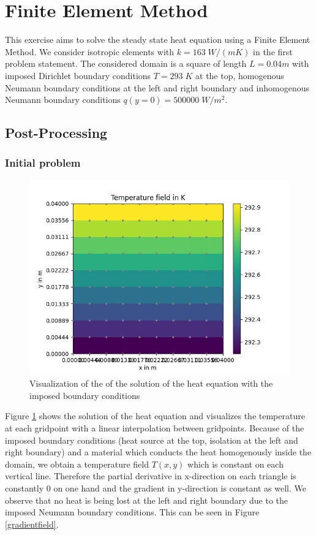 \documentclass[a4paper,pt]{report}
\begin{document}
\section*{Finite Element Method}
This exercise aims to solve the steady state heat equation using a Finite Element Method.
We consider isotropic elements with $k = 163 \;W/(mK)$ in the first problem statement.
The considered domain is a square of length $L=0.04 m$ with imposed Dirichlet boundary conditions $T=293 \; K$ at the top, homogenous Neumann boundary conditions at the left and right boundary and inhomogenous Neumann boundary conditions $q(y=0)=500000 \; W/m^2$.

\subsection*{Post-Processing}
\subsubsection*{Initial problem}

\begin{figure}
	\centering
	\includegraphics[scale=0.6]{temperaturefield.png}
	\caption{Visualization of the of the solution of the heat equation with the imposed boundary conditions}
	\label{temperaturefield}
\end{figure} 

Figure \ref{temperaturefield} shows the solution of the heat equation and visualizes the temperature at each gridpoint with a linear interpolation between gridpoints. Because of the imposed boundary conditions (heat source at the top, isolation at the left and right boundary) and a material which conducts the heat homogenously inside the domain, we obtain a temperature field $T(x,y)$ which is constant on each vertical line. 
Therefore the partial derivative in x-direction on each triangle is constantly 0 on one hand and the gradient in y-direction is constant as  well. We observe that no heat is being lost at the left and right boundary due to the imposed Neumann boundary conditions. This can be seen in Figure \ref{gradientfield}. 
\end{document}
